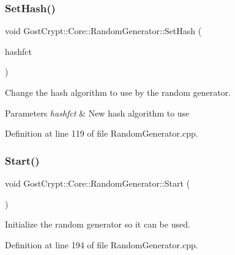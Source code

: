 \subsubsection{\texorpdfstring{Set\+Hash()}{SetHash()}}
{\footnotesize\ttfamily void Gost\+Crypt\+::\+Core\+::\+Random\+Generator\+::\+Set\+Hash (\begin{DoxyParamCaption}\item[{Q\+Shared\+Pointer$<$ \hyperlink{class_gost_crypt_1_1_volume_1_1_volume_hash}{Volume\+::\+Volume\+Hash} $>$}]{hashfct }\end{DoxyParamCaption})\hspace{0.3cm}{\ttfamily [static]}}



Change the hash algorithm to use by the random generator. 


\begin{DoxyParams}{Parameters}
{\em hashfct} & New hash algorithm to use \\
\hline
\end{DoxyParams}


Definition at line 119 of file Random\+Generator.\+cpp.

\mbox{\label{class_gost_crypt_1_1_core_1_1_random_generator_aab4240cc7c941091e0e02f1e88c6bdcd}} 
\subsubsection{\texorpdfstring{Start()}{Start()}}
{\footnotesize\ttfamily void Gost\+Crypt\+::\+Core\+::\+Random\+Generator\+::\+Start (\begin{DoxyParamCaption}{ }\end{DoxyParamCaption})\hspace{0.3cm}{\ttfamily [static]}}



Initialize the random generator so it can be used. 



Definition at line 194 of file Random\+Generator.\+cpp.

\mbox{\label{class_gost_crypt_1_1_core_1_1_random_generator_af1884c6e4c31cf12445857ecacad68d5}} 
